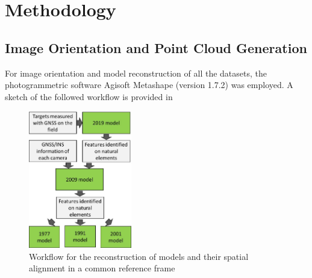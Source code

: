 \section{Methodology}\label{sec:2:methods}

\subsection{Image Orientation and Point Cloud Generation}

For image orientation and model reconstruction of all the datasets, the photogrammetric software Agisoft Metashape (version 1.7.2) was employed. A sketch of the followed
workflow is provided in 

\begin{figure}
    \centering
    \includegraphics[width=0.4\textwidth]{workflow}
    \caption{Workflow for the reconstruction of models and their spatial alignment in a common reference frame}
    \label{fig:2:workflow}
\end{figure}

